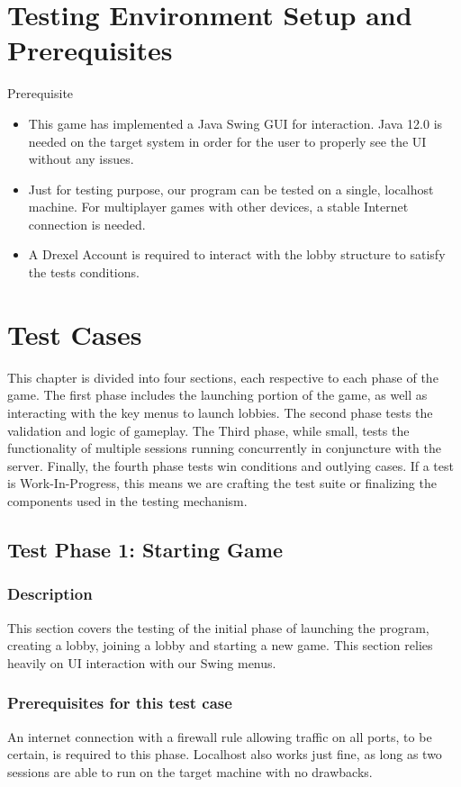 \documentclass{scrreprt}
\begin{document}
\chapter{Testing Environment Setup and Prerequisites}

Prerequisite
\begin{itemize}
  \item This game has implemented a Java Swing GUI for interaction. Java 12.0 is needed on the target system in order for the user to properly see the UI without any issues.
  \item Just for testing purpose, our program can be tested on a single, localhost machine. For multiplayer games with other devices, a stable Internet connection is needed.
  \item A Drexel Account is required to interact with the lobby structure to satisfy the tests conditions.
\end{itemize}

\chapter{Test Cases}

This chapter is divided into four sections, each respective to each phase of the game. The first phase includes the launching portion of the game, as well as interacting with the key menus to launch lobbies. The second phase tests the validation and logic of gameplay. The Third phase, while small, tests the functionality of multiple sessions running concurrently in conjuncture with the server. Finally, the fourth phase tests win conditions and outlying cases. If a test is Work-In-Progress, this means we are crafting the test suite or finalizing the components used in the testing mechanism.

\section{Test Phase 1: Starting Game}

\subsection{Description}
This section covers the testing of the initial phase of launching the program, creating a lobby, joining a lobby and starting a new game. This section relies heavily on UI interaction with our Swing menus.
\subsection{Prerequisites for this test case} An internet connection with a firewall rule allowing traffic on all ports, to be certain, is required to this phase. Localhost also works just fine, as long as two sessions are able to run on the target machine with no drawbacks.
\end{document}
